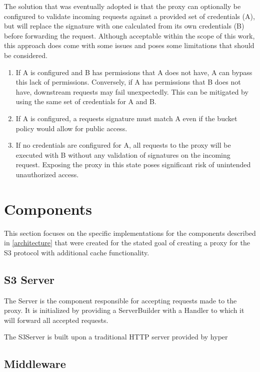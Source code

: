 The solution that was eventually adopted is that the proxy can optionally be configured to validate incoming requests against a provided set of credentials (A), but will replace the signature with one calculated from its own credentials (B) before forwarding the request.
Although acceptable within the scope of this work, this approach does come with some issues and poses some limitations that should be considered. 
\begin{enumerate}
	\item If A is configured and B has permissions that A does not have, A can bypass this lack of permissions. Conversely, if A has permissions that B does not have, downstream requests may fail unexpectedly. This can be mitigated by using the same set of credentials for A and B.
	\item If A is configured, a requests signature must match A even if the bucket policy would allow for public access.
	\item If no credentials are configured for A, all requests to the proxy will be executed with B without any validation of signatures on the incoming request. Exposing the proxy in this state poses significant risk of unintended unauthorized access.
\end{enumerate}

\section{Components}

This section focuses on the specific implementations for the components described in \ref{architecture} that were created for the stated goal of creating a proxy for the S3 protocol with additional cache functionality.

\subsection{S3 Server}

The Server is the component responsible for accepting requests made to the proxy. It is initialized by providing a ServerBuilder with a Handler to which it will forward all accepted requests.

The S3Server is built upon a traditional HTTP server provided by hyper

\subsection{Middleware}

